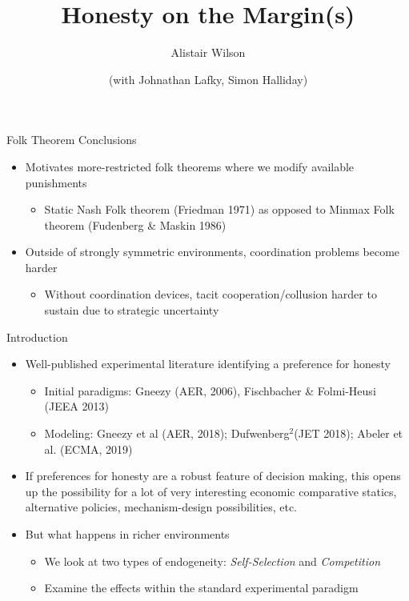 \documentclass{beamer}
\begin{document}
\begin{frame}{Folk Theorem Conclusions}
\begin{itemize}
\item Motivates more-restricted folk theorems where we modify available
punishments
\begin{itemize}
\item Static Nash Folk theorem (Friedman 1971) as opposed to Minmax Folk
theorem (Fudenberg \& Maskin 1986)
\end{itemize}
\item Outside of strongly symmetric environments, coordination problems
become harder
\begin{itemize}
\item Without coordination devices, tacit cooperation/collusion harder to
sustain due to strategic uncertainty
\end{itemize}
\end{itemize}
\end{frame}

    \title{Honesty on the Margin(s)}
    \author{Alistair Wilson\and  (with Johnathan Lafky, Simon Halliday)}
    \maketitle

\begin{frame}{Introduction}
    \begin{itemize}
        \item Well-published experimental literature identifying a preference for
        honesty
            \begin{itemize}
                \item Initial paradigms: Gneezy (AER, 2006), Fischbacher \& Folmi-Heusi
                (JEEA 2013)
                \item Modeling: Gneezy et al (AER, 2018); Dufwenberg$^{2}$(JET 2018); Abeler
                et al. (ECMA, 2019)
            \end{itemize}
        \item If preferences for honesty are a robust feature of decision making, this opens up the possibility for a lot of very interesting economic comparative statics, alternative policies, mechanism-design possibilities, etc.\pause
        \item But what happens in richer environments
            \begin{itemize}
                \item We look at two types of endogeneity: \emph{Self-Selection} and \emph{Competition}
                \item Examine the effects within the standard experimental paradigm
            \end{itemize}
    \end{itemize}
\end{frame}
\end{document}
